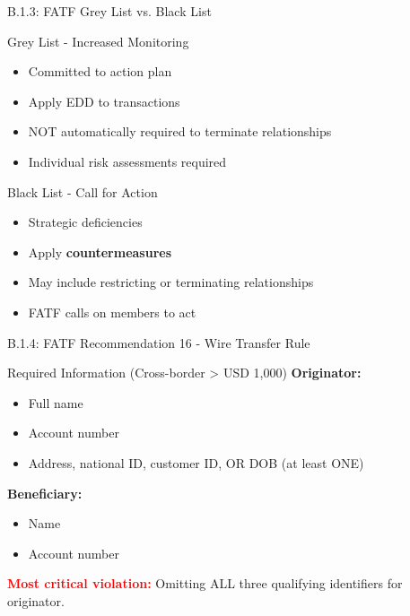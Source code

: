 \documentclass{beamer}
\begin{document}
	\begin{frame}{B.1.3: FATF Grey List vs. Black List}
		\begin{block}{Grey List - Increased Monitoring}
			\begin{itemize}
				\item Committed to action plan
				\item Apply EDD to transactions
				\item NOT automatically required to terminate relationships
				\item Individual risk assessments required
			\end{itemize}
		\end{block}
		\begin{block}{Black List - Call for Action}
			\begin{itemize}
				\item Strategic deficiencies
				\item Apply \textbf{countermeasures}
				\item May include restricting or terminating relationships
				\item FATF calls on members to act
			\end{itemize}
		\end{block}
	\end{frame}
	
	\begin{frame}{B.1.4: FATF Recommendation 16 - Wire Transfer Rule}
		\begin{block}{Required Information (Cross-border > USD 1,000)}
			\textbf{Originator:}
			\begin{itemize}
				\item Full name
				\item Account number
				\item Address, national ID, customer ID, OR DOB (at least ONE)
			\end{itemize}
			\textbf{Beneficiary:}
			\begin{itemize}
				\item Name
				\item Account number
			\end{itemize}
		\end{block}
		\textcolor{red}{\textbf{Most critical violation:}} Omitting ALL three qualifying identifiers for originator.
	\end{frame}
	
\end{document}
